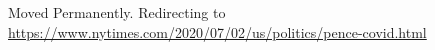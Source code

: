 Moved Permanently. Redirecting to
\url{https://www.nytimes.com/2020/07/02/us/politics/pence-covid.html}
